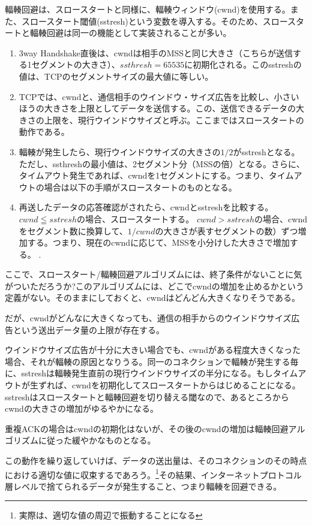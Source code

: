 輻輳回避は、スロースタートと同様に、輻輳ウィンドウ(cwnd)を使用する。また、スロースタート閾値(sstresh)という変数を導入する。そのため、スロースタートと輻輳回避は同一の機能として実装されることが多い。

\begin{enumerate}
\item  3way Handshake直後は、cwndは相手のMSSと同じ大きさ（こちらが送信する1セグメントの大きさ）、$ssthresh=65535$に初期化される。このsstreshの値は、TCPのセグメントサイズの最大値に等しい。
\item TCPでは、cwndと、通信相手のウインドウ・サイズ広告を比較し、小さいほうの大きさを上限としてデータを送信する。この、送信できるデータの大きさの上限を、現行ウインドウサイズと呼ぶ。ここまではスロースタートの動作である。
\item 輻輳が発生したら、現行ウインドウサイズの大きさの$1/2$がsstreshとなる。ただし、ssthreshの最小値は、2セグメント分（MSSの倍）となる。さらに、タイムアウト発生であれば、cwndを1セグメントにする。つまり、タイムアウトの場合は以下の手順がスロースタートのものとなる。
\item  再送したデータの応答確認がされたら、cwndとsstreshを比較する。
           $cwnd≦sstresh$の場合、スロースタートする。
$cwnd>sstresh$の場合、cwndをセグメント数に換算して、$1/cwnd$の大きさが表すセグメントの数）ずつ増加する。つまり、現在のcwndに応じて、MSSを小分けした大きさで増加する。
.
\end{enumerate}

ここで、スロースタート/輻輳回避アルゴリズムには、終了条件がないことに気がついただろうか?このアルゴリズムには、どこでcwndの増加を止めるかという定義がない。そのままにしておくと、cwndはどんどん大きくなりそうである。

だが、cwndがどんなに大きくなっても、通信の相手からのウインドウサイズ広告という送出データ量の上限が存在する。

ウインドウサイズ広告が十分に大きい場合でも、cwndがある程度大きくなった場合、それが輻輳の原因となりうる。同一のコネクションで輻輳が発生する毎に、sstreshは輻輳発生直前の現行ウインドウサイズの半分になる。もしタイムアウトが生ずれば、cwndを初期化してスロースタートからはじめることになる。sstreshはスロースタートと輻輳回避を切り替える閾なので、あるところからcwndの大きさの増加がゆるやかになる。

重複ACKの場合はcwndの初期化はないが、その後のcwndの増加は輻輳回避アルゴリズムに従った緩やかなものとなる。

この動作を繰り返していけば、データの送出量は、そのコネクションのその時点における適切な値に収束するであろう。\footnote{実際は、適切な値の周辺で振動することになる}その結果、インターネットプロトコル層レベルで捨てられるデータが発生すること、つまり輻輳を回避できる。

